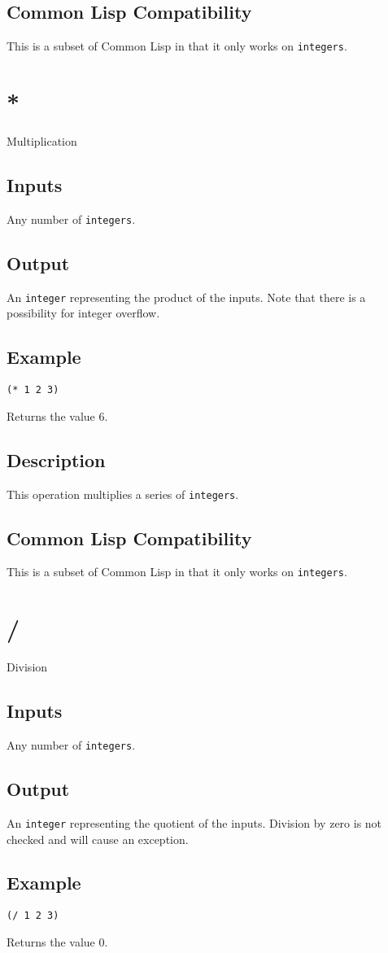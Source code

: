 \documentclass[10pt, openany]{book}
\newcommand{\datatype}[1]{\texttt{#1}}
\newcommand{\cl}{Common Lisp}
\begin{document}
\subsection{Common Lisp Compatibility}
This is a subset of \cl{} in that it only works on \datatype{integers}.

\section{*}
Multiplication
\subsection{Inputs}
Any number of \datatype{integers}.
\subsection{Output}
An \datatype{integer} representing the product of the inputs.  Note that there is a possibility for integer overflow.
\subsection{Example}
\begin{lstlisting}
(* 1 2 3)
\end{lstlisting}
Returns the value 6.
\subsection{Description}
This operation multiplies a series of \datatype{integers}.
\subsection{Common Lisp Compatibility}
This is a subset of \cl{} in that it only works on \datatype{integers}.

\section{/}
Division
\subsection{Inputs}
Any number of \datatype{integers}.
\subsection{Output}
An \datatype{integer} representing the quotient of the inputs.  Division by zero is not checked and will cause an exception.
\subsection{Example}
\begin{lstlisting}
(/ 1 2 3)
\end{lstlisting}
Returns the value 0.
\end{document}
